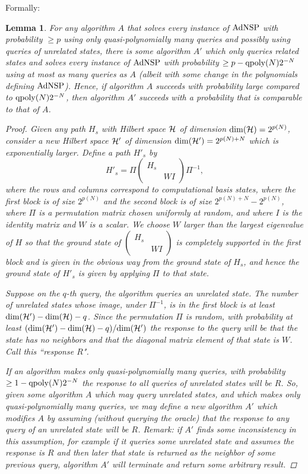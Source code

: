 \documentclass[letterpaper,onecolumn]{quantumarticle}
\newtheorem{lemma}{Lemma}
\newcommand{\be}{\begin{equation}}
\newcommand{\ee}{\end{equation}}
\newcommand{\qpoly}{{\rm qpoly}}
\newcommand{\Ocl}{{\rm AdNSP}}
\newcommand{\cH}{{\cal H}}
\begin{document}
Formally:
\begin{lemma}
\label{relstatelemma}
For any algorithm $A$ that solves every instance of $\Ocl$ with probability $\geq p$ using only quasi-polynomially many queries and possibly using queries of unrelated states,
there is some algorithm $A'$ which only queries related states and solves every instance of $\Ocl$ with probability $\geq p-\qpoly(N) 2^{-N}$ using at most as many queries as $A$ (albeit with some change in the polynomials defining $\Ocl$).
Hence, if algorithm $A$ succeeds with probability large compared to $\qpoly(N)2^{-N}$, then algorithm $A'$ succeeds with a probability that is comparable to that of $A$.
\begin{proof}
Given any path $H_s$ with Hilbert space $\cH$ of dimension ${\rm dim}(\cH)=2^{p(N)}$, consider a new Hilbert space $\cH'$ of dimension ${\rm dim}(\cH')=2^{p(N)+N}$ which is exponentially larger.  Define
a path $H'_s$ by
\be
\label{perminto}
H'_s=\Pi \begin{pmatrix} H_s & \\ & W I\end{pmatrix} \Pi^{-1},
\ee
where the rows and columns correspond to computational basis states, 
where the first block is of size $2^{p(N)}$ and the second block is of size $2^{p(N)+N}-2^{p(N)}$, 
where $\Pi$ is a permutation matrix chosen uniformly at random,
and where $I$ is the identity matrix
and $W$ is a scalar.  We choose $W$ larger than the largest eigenvalue of $H$ so that
the ground state of $\begin{pmatrix} H_s & \\ & W I\end{pmatrix}$ is completely supported in the first block and is given in the obvious way from the ground state of $H_s$, and hence the ground state of $H'_s$ is given by applying $\Pi$ to that state.



Suppose on the $q$-th query, the algorithm queries an unrelated state.  The number of unrelated states whose image, under $\Pi^{-1}$, is in the first block is at least ${\rm dim}(\cH')-{\rm dim}(\cH)-q$.
Since the permutation $\Pi$ is random, with probability at least $({\rm dim}(\cH')-{\rm dim}(\cH)-q)/{\rm dim}(\cH')$ the response to the query will be that the state has no neighbors and that the diagonal matrix element of that state is $W$.
Call this ``response $R$".

If an algorithm makes only quasi-polynomially many queries, with probability $\geq 1-\qpoly(N)2^{-N}$ the response to
{\it all} queries of unrelated states will be $R$.
So, given some algorithm $A$ which may query unrelated states, and which makes only quasi-polynomially many queries, we may define a new algorithm $A'$ which modifies $A$ by assuming (without querying the oracle) that the response to any query of an unrelated state will be $R$.  Remark: if $A'$ finds some inconsistency in this assumption, for example if it queries some unrelated state and assumes the response is $R$ and then later that state is returned as the neighbor of some previous query, algorithm $A'$ will terminate and return some arbitrary result.


\end{proof}
\end{lemma}
\end{document}
